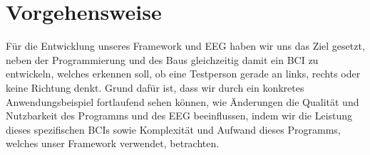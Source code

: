 \documentclass[10pt]{article}
\begin{document}
\begin{itemize}
\end{itemize}
 
\section{Vorgehensweise}

Für die Entwicklung unseres Framework und EEG haben wir uns das Ziel gesetzt, neben der Programmierung und des Baus gleichzeitig damit ein BCI zu entwickeln, welches erkennen soll, ob eine Testperson gerade an links, rechts oder keine Richtung denkt.
Grund dafür ist, dass wir durch ein konkretes Anwendungsbeispiel fortlaufend sehen können, wie Änderungen die Qualität und Nutzbarkeit des Programms und des EEG beeinflussen, indem wir die Leistung dieses spezifischen BCIs sowie Komplexität und Aufwand dieses Programms, welches unser Framework verwendet, betrachten.
\end{document}
